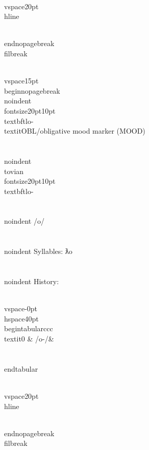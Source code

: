 \\vspace{20pt}\\hline

\\end{nopagebreak}
\\filbreak



\\vspace{15pt}
\\begin{nopagebreak}
\\noindent{\\fontsize{20pt}{10pt}\\textbf{tlo-} } \\textit{OBL/obligative mood marker} (MOOD)\\\\
\\noindent {\\tovian \\fontsize{20pt}{10pt} \\textbf{tlo-} }\\\\
\\noindent /{}{\textprimstress}o/\\\\
\\noindent Syllables: ƛo\\\\


\\noindent History:

\\vspace{-0pt}
\\hspace{40pt}
\\begin{tabular}{ccc}
\\textit{0} & /{}o-/& \\\\
\\end{tabular}

\\vspace{20pt}\\hline

\\end{nopagebreak}
\\filbreak



